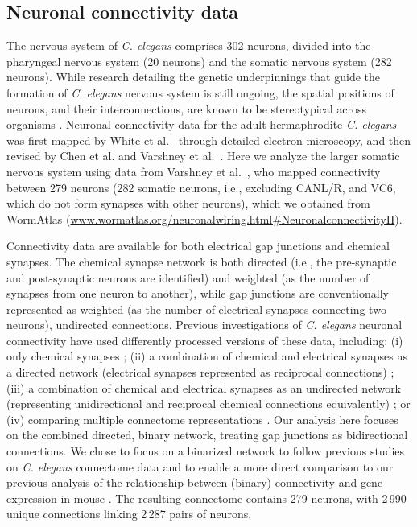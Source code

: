 \documentclass[10pt,letterpaper]{article}
\begin{document}
\subsection*{Neuronal connectivity data}
The nervous system of \emph{C. elegans} comprises 302 neurons, divided into the pharyngeal nervous system (20 neurons) and the somatic nervous system (282 neurons).
While research detailing the genetic underpinnings that guide the formation of \textit{C. elegans} nervous system is still ongoing, the spatial positions of neurons, and their interconnections, are known to be stereotypical across organisms \cite{Riddle1997}.
Neuronal connectivity data for the adult hermaphrodite \emph{C. elegans} was first mapped by White et al.~\cite{White:1986tx} through detailed electron microscopy, and then revised by Chen et al. \cite{Chen:2006ie} and Varshney et al.~\cite{Varshney2011}.
Here we analyze the larger somatic nervous system using data from Varshney et al.~\cite{Varshney2011}, who mapped connectivity between 279 neurons (282 somatic neurons, i.e., excluding CANL/R, and VC6, which do not form synapses with other neurons), which we obtained from WormAtlas \cite{WormAtlas} (\url{www.wormatlas.org/neuronalwiring.html#NeuronalconnectivityII}).

Connectivity data are available for both electrical gap junctions and chemical synapses.
The chemical synapse network is both directed (i.e., the pre-synaptic and post-synaptic neurons are identified) and weighted (as the number of synapses from one neuron to another), while gap junctions are conventionally represented as weighted (as the number of electrical synapses connecting two neurons), undirected connections.
Previous investigations of \emph{C. elegans} neuronal connectivity have used differently processed versions of these data, including:
(i) only chemical synapses \cite{Kashtan:2004ev};
(ii) a combination of chemical and electrical synapses as a directed network (electrical synapses represented as reciprocal connections) \cite{Azulay:2016cg, Kim:2016gl};
(iii) a combination of chemical and electrical synapses as an undirected network (representing unidirectional and reciprocal chemical connections equivalently) \cite{Towlson2013, Kim:2014bu, Pavlovic:2014gx, van2017guiding};
or (iv) comparing multiple connectome representations \cite{Pan:2010jt}.
Our analysis here focuses on the combined directed, binary network, treating gap junctions as bidirectional connections.
We chose to focus on a binarized network to follow previous studies on \textit{C. elegans} connectome data \cite{Kaufman2006, Towlson2013, Varier2011, Varadan2006, Pavlovic:2014gx} and to enable a more direct comparison to our previous analysis of the relationship between (binary) connectivity and gene expression in mouse \cite{Fulcher:2016ck}.
The resulting connectome contains 279 neurons, with 2\,990 unique connections linking 2\,287 pairs of neurons.
\end{document}
